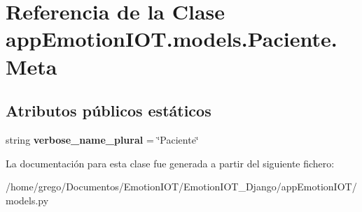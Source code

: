 \hypertarget{classappEmotionIOT_1_1models_1_1Paciente_1_1Meta}{}\section{Referencia de la Clase app\+Emotion\+I\+O\+T.\+models.\+Paciente.\+Meta}
\label{classappEmotionIOT_1_1models_1_1Paciente_1_1Meta}
\subsection*{Atributos públicos estáticos}
\begin{DoxyCompactItemize}
\item 
string {\bfseries verbose\+\_\+name\+\_\+plural} = \char`\"{}Paciente\char`\"{}\hypertarget{classappEmotionIOT_1_1models_1_1Paciente_1_1Meta_a8fd0bdb65268a70514900d32d80536fe}{}\label{classappEmotionIOT_1_1models_1_1Paciente_1_1Meta_a8fd0bdb65268a70514900d32d80536fe}

\end{DoxyCompactItemize}


La documentación para esta clase fue generada a partir del siguiente fichero\+:\begin{DoxyCompactItemize}
\item 
/home/grego/\+Documentos/\+Emotion\+I\+O\+T/\+Emotion\+I\+O\+T\+\_\+\+Django/app\+Emotion\+I\+O\+T/models.\+py\end{DoxyCompactItemize}
